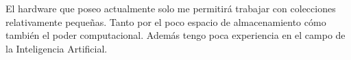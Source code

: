 \documentclass[../main.tex]{subfiles}
\begin{document}
%
%


El hardware que poseo actualmente solo me permitirá trabajar con colecciones relativamente pequeñas.
Tanto por el poco espacio de almacenamiento cómo también el poder computacional.
Además tengo poca experiencia en el campo de la Inteligencia Artificial.

\end{document}
